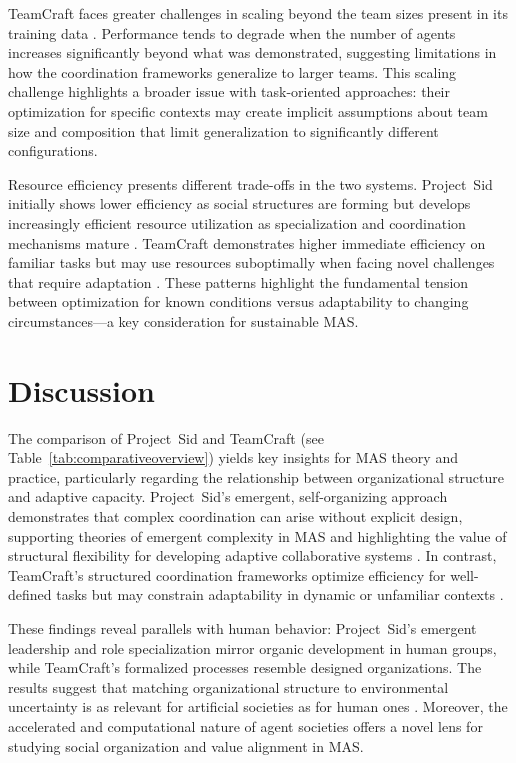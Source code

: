 \documentclass[a4paper, 12pt]{article}
\begin{document}
TeamCraft faces greater challenges in scaling beyond the team sizes present in its training data \autocite{Long2024, Yu2024}. Performance tends to degrade when the number of agents increases significantly beyond what was demonstrated, suggesting limitations in how the coordination frameworks generalize to larger teams. This scaling challenge highlights a broader issue with task-oriented approaches: their optimization for specific contexts may create implicit assumptions about team size and composition that limit generalization to significantly different configurations.

Resource efficiency presents different trade-offs in the two systems. Project~Sid initially shows lower efficiency as social structures are forming but develops increasingly efficient resource utilization as specialization and coordination mechanisms mature \autocite{Altera2024}. TeamCraft demonstrates higher immediate efficiency on familiar tasks but may use resources suboptimally when facing novel challenges that require adaptation \autocite{Long2024}. These patterns highlight the fundamental tension between optimization for known conditions versus adaptability to changing circum\-stances---a key consideration for sustainable MAS.

\section{Discussion}

The comparison of Project~Sid and TeamCraft (see Table~\ref{tab:comparativeoverview}) yields key insights for MAS theory and practice, particularly regarding the relationship between organizational structure and adaptive capacity. Project~Sid's emergent, self-organizing approach demonstrates that complex coordination can arise without explicit design, supporting theories of emergent complexity in MAS and highlighting the value of structural flexibility for developing adaptive collaborative systems \autocite{Altera2024}. In contrast, TeamCraft's structured coordination frameworks optimize efficiency for well-defined tasks but may constrain adaptability in dynamic or unfamiliar contexts \autocite{Long2024}.

These findings reveal parallels with human behavior: Project~Sid's emergent leadership and role specialization mirror organic development in human groups, while TeamCraft's formalized processes resemble designed organizations. The results suggest that matching organizational structure to environmental uncertainty is as relevant for artificial societies as for human ones \autocite{Chen2024, Lhaksmana2018}. Moreover, the accelerated and computational nature of agent societies offers a novel lens for studying social organization and value alignment in MAS.
\end{document}
